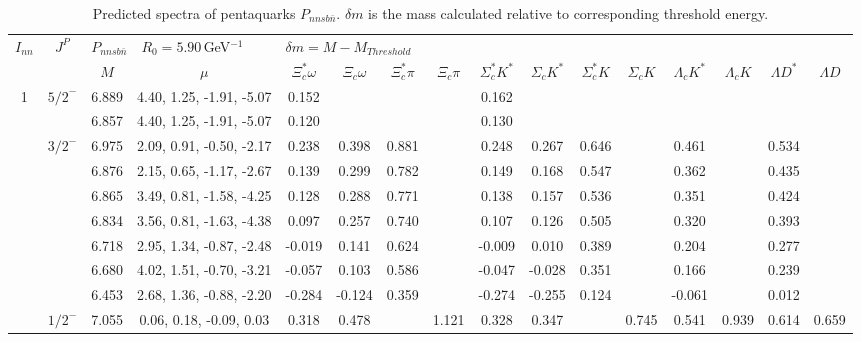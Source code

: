 \documentclass[prd,twocolumn,floatfix,nofootinbib]{revtex4}
\begin{document}
\renewcommand{\tabcolsep}{0.09cm}
\renewcommand{\arraystretch}{1.0}
\begin{table*}[!htbp]
    \caption{Predicted spectra of pentaquarks $P_{nnsb\bar{n}}$.
        $\delta m$ is the mass calculated relative to corresponding threshold energy.}
    \label{tab:nnsbn}
    \begin{tabular}{cc|cc|cccccccccccc}
        \bottomrule[1.5pt]\bottomrule[0.5pt]
        \multirow{2}{*}{$I_{nn}$} &\multirow{2}{*}{$J^{P}$} 
        &\multicolumn{2}{l|}{$P_{nnsb\bar{n}}\quad R_{0}=5.90\,$GeV$^{-1}$}
        &\multicolumn{12}{l}{$\delta m=M-M_{Threshold}$} \\
        & &$M$ &$\mu$ &$\Xi_{c}^{\ast}\omega$ &$\Xi_{c}\omega$ &$\Xi_{c}^{\ast}\pi$ &$\Xi_{c}\pi$ 
        &$\Sigma_{c}^{\ast}K^{\ast}$ &$\Sigma_{c}K^{\ast}$ &$\Sigma_{c}^{\ast}K$ &$\Sigma_{c}K$  
        &$\Lambda_{c}K^{\ast}$ &$\Lambda_{c}K$ &$\Lambda D^{\ast}$ &$\Lambda D$ \\ \hline
        1
            &${5/2}^{-}$    &6.889  &4.40, 1.25, -1.91, -5.07 &0.152 & & & &0.162 & & & & & & & \\
            &               &6.857  &4.40, 1.25, -1.91, -5.07 &0.120 & & & &0.130 & & & & & & & \\
            &${3/2}^{-}$    &6.975  &2.09, 0.91, -0.50, -2.17 &0.238 &0.398 &0.881 & &0.248 &0.267 &0.646 & &0.461 & &0.534 & \\
            &               &6.876  &2.15, 0.65, -1.17, -2.67 &0.139 &0.299 &0.782 & &0.149 &0.168 &0.547 & &0.362 & &0.435 & \\
            &               &6.865  &3.49, 0.81, -1.58, -4.25 &0.128 &0.288 &0.771 & &0.138 &0.157 &0.536 & &0.351 & &0.424 & \\
            &               &6.834  &3.56, 0.81, -1.63, -4.38 &0.097 &0.257 &0.740 & &0.107 &0.126 &0.505 & &0.320 & &0.393 & \\
            &               &6.718  &2.95, 1.34, -0.87, -2.48 &-0.019 &0.141 &0.624 & &-0.009 &0.010 &0.389 & &0.204 & &0.277 & \\
            &               &6.680  &4.02, 1.51, -0.70, -3.21 &-0.057 &0.103 &0.586 & &-0.047 &-0.028 &0.351 & &0.166 & &0.239 & \\
            &               &6.453  &2.68, 1.36, -0.88, -2.20 &-0.284 &-0.124 &0.359 & &-0.274 &-0.255 &0.124 & &-0.061 & &0.012 & \\
            &${1/2}^{-}$    &7.055  &0.06, 0.18, -0.09, 0.03 &0.318 &0.478 & &1.121 &0.328 &0.347 & &0.745 &0.541 &0.939 &0.614 &0.659 \\

\end{tabular}
\end{table*}
\end{document}
